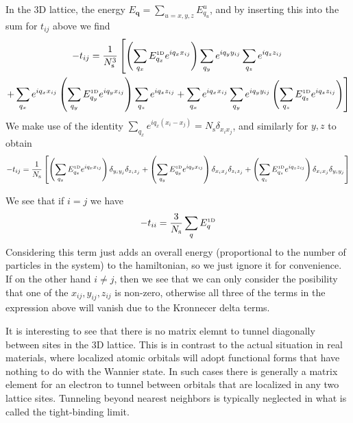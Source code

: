 \documentclass[11pt,letter]{article}
\newcommand{\bv}[1]{\ensuremath{\bm{#1}}}
\begin{document}
In the 3D lattice, the energy $E_{\bv{q}} = \sum_{u=x,y,z} E_{q_{u}}^{u} $, and by inserting this into the sum for $t_{ij}$ above we find 
\begin{multline}
-t_{ij} =  \frac{1}{N_{\mathrm{s}}^{3}} \left[ 
          \left(\sum_{q_{x}} E_{q_{x}}^{\text{\tiny 1D}}   e^{ i q_{x} x_{ij} }   \right)
          \sum_{q_{y}} e^{ i q_{y} y_{ij} }   
          \sum_{q_{z}} e^{ i q_{z} z_{ij} }  
   \right. \\
\left. 
          + 
          \sum_{q_{x}} e^{ i q_{x} x_{ij} }  
          \left(\sum_{q_{y}} E_{q_{y}}^{\text{\tiny 1D}}   e^{ i q_{y} x_{ij} }   \right)
          \sum_{q_{z}} e^{ i q_{z} z_{ij} }  
          + 
          \sum_{q_{x}} e^{ i q_{x} x_{ij} }  
          \sum_{q_{y}} e^{ i q_{y} y_{ij} }   
          \left(\sum_{q_{z}} E_{q_{z}}^{\text{\tiny 1D}}   e^{ i q_{z} z_{ij} }   \right)
\right]
\end{multline}
We make use of the identity $\sum_{q_{x}} e^{ iq_{x}(x_{i}-x_{j}) } = N_{\mathrm{s}} \delta_{x_{i}x_{j}}$, and similarly for $y,z$ to obtain
\begin{equation}
-t_{ij} =  \frac{1}{N_{\mathrm{s}}} \left[ 
          \left(\sum_{q_{x}} E_{q_{x}}^{\text{\tiny 1D}}   e^{ i q_{x} x_{ij} }   \right)
          \delta_{y_{i}y_{j}}
          \delta_{z_{i}z_{j}}
          + 
          \left(\sum_{q_{y}} E_{q_{y}}^{\text{\tiny 1D}}   e^{ i q_{y} x_{ij} }   \right)
          \delta_{x_{i}x_{j}}
          \delta_{z_{i}z_{j}}
          + 
          \left(\sum_{q_{z}} E_{q_{z}}^{\text{\tiny 1D}}   e^{ i q_{z} z_{ij} }   \right)
          \delta_{x_{i}x_{j}}
          \delta_{y_{i}y_{j}}
\right]
\end{equation}

We see that if $i=j$ we have 
\begin{equation}
  -t_{ii} =  \frac{3}{N_{\mathrm{s}}} 
          \sum_{q} E_{q}^{\text{\tiny 1D}}  
\end{equation}
Considering this term just adds an overall energy (proportional to the number
of particles in the system) to the hamiltonian, so we just ignore it for
convenience.  If on the other hand $i\neq j$, then we see that we can only
consider the posibility that one of the $x_{ij}, y_{ij}, z_{ij}$ is non-zero,
otherwise all three of the terms in the expression above will vanish
due to the Kronnecer delta terms. 

It is interesting to see that there is no matrix elemnt to tunnel 
diagonally between sites in the 3D lattice.  
This is in contrast to  the
actual situation in real materials, where localized atomic orbitals will adopt
functional forms that have nothing to do with the Wannier state.  In such cases
there is generally a matrix element for an electron to
tunnel between orbitals that are localized in any two lattice sites.
Tunneling beyond nearest neighbors is typically neglected in what is called the
tight-binding limit.
\end{document}
